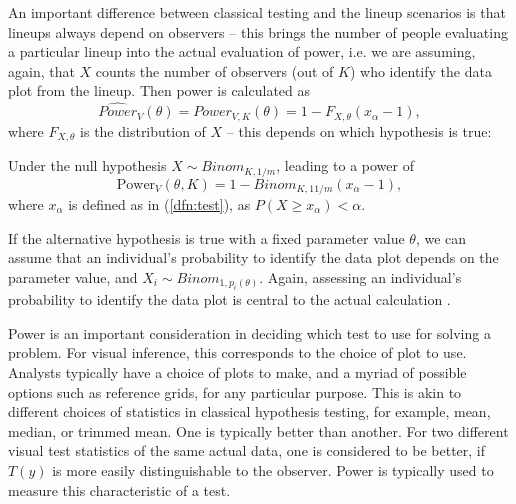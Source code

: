 \documentclass{article}
\newcommand{\red}[1]{{\color{red} #1}}
\newcommand{\hh}[1]{{\color{orange} #1}} %
\begin{document}
\hh{\noindent An important difference between classical testing and the lineup scenarios is that lineups always depend on observers -- this brings the number of people evaluating a particular lineup into the actual evaluation of power, i.e. we are assuming, again, that $X$ counts the number of observers (out of $K$) who identify the data plot from the lineup.
Then power is calculated as
\[
\widehat{Power}_{V} (\theta) = {Power}_{V, K} (\theta) = 1 - F_{X, \theta} (x_{\alpha} - 1),
\] 
where $F_{X, \theta}$ is the distribution of $X$ -- this depends on which hypothesis is true:

Under the null hypothesis $X \sim Binom_{K, 1/m}$, leading to a power of 
\[
\text{Power}_V(\theta, K)= 1 - Binom_{K, 11/m} (x_\alpha - 1),
\]
where $x_\alpha$ is defined as in (\ref{dfn:test}), as  $P(X \ge x_{\alpha}) < \alpha$.

If the alternative hypothesis is true with a fixed parameter value $\theta$, we can assume that an individual's probability to identify the data plot depends on the parameter value, and $X_i \sim Binom_{1, p_i(\theta)}$. Again, assessing an individual's probability to identify the data plot  is central to the actual calculation .
}


Power is an important consideration in deciding which test to use for solving a problem. %
For visual inference, this corresponds to the choice of plot to use. Analysts typically have a choice of plots to make, and a myriad of possible options such as reference grids, for any particular purpose. This is akin to different choices of statistics in classical hypothesis testing, for example, mean, median, or trimmed mean. One is typically better than another. For two different visual test statistics of the same actual data, one is considered to be better, if $T(y)$ is more easily distinguishable to the observer. Power is typically used to measure this characteristic of a test. %
\end{document}
